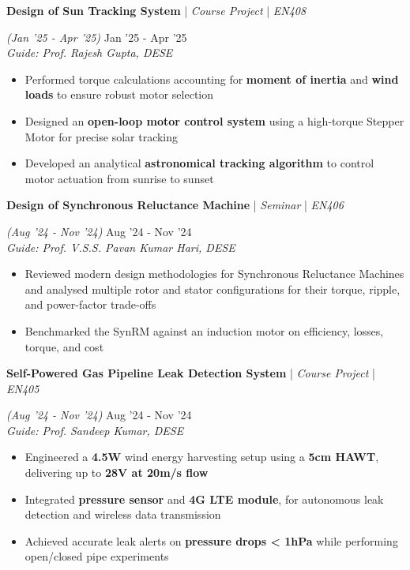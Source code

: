 \documentclass[10pt]{article}
\renewcommand{\subsection}[5]{
	\def\temp{#4}
	\vspace{2pt}
	{
		\large
		{\textbf{#1}} | {\sl #2} | {\sl #3} \filldate{#4}
		\ifx\temp\empty
		\else
		{
			\\[0.1em]
			\fontsize{11}{13.2}\selectfont
			\sl #5
		}
		\fi
	}
}
\newcommand{\filldate}[1]{\strut\hfill {\small \textit{(#1)}}}
\begin{document}
\subsection{Design of Sun Tracking System}{Course Project}{EN408}{Jan '25 - Apr '25}{Guide: Prof. Rajesh Gupta, DESE}
\begin{itemize}
	\item Performed torque calculations accounting for \textbf{moment of inertia} and \textbf{wind loads} to ensure robust motor selection
	\item Designed an \textbf{open-loop motor control system} using a high-torque Stepper Motor for precise solar tracking
	\item Developed an analytical \textbf{astronomical tracking algorithm} to control motor actuation from sunrise to sunset
\end{itemize}

\subsection{Design of Synchronous Reluctance Machine}{Seminar}{EN406}{Aug '24 - Nov '24}{Guide: Prof. V.S.S. Pavan Kumar Hari, DESE}
\begin{itemize}
	\item Reviewed modern design methodologies for Synchronous Reluctance Machines and analysed multiple rotor and stator configurations for their torque, ripple, and power-factor trade-offs
	\item Benchmarked the SynRM against an induction motor on efficiency, losses, torque, and cost
\end{itemize}

\subsection{Self-Powered Gas Pipeline Leak Detection System}{Course Project}{EN405}{Aug '24 - Nov '24}{Guide: Prof. Sandeep Kumar, DESE}
\begin{itemize}
	\item Engineered a \textbf{4.5W} wind energy harvesting setup using a \textbf{5cm HAWT}, delivering up to \textbf{28V at 20m/s flow} 
	\item Integrated \textbf{pressure sensor} and \textbf{4G LTE module}, for autonomous leak detection and wireless data transmission
	\item Achieved accurate leak alerts on \textbf{pressure drops < 1hPa} while performing open/closed pipe experiments
\end{itemize}
\end{document}

